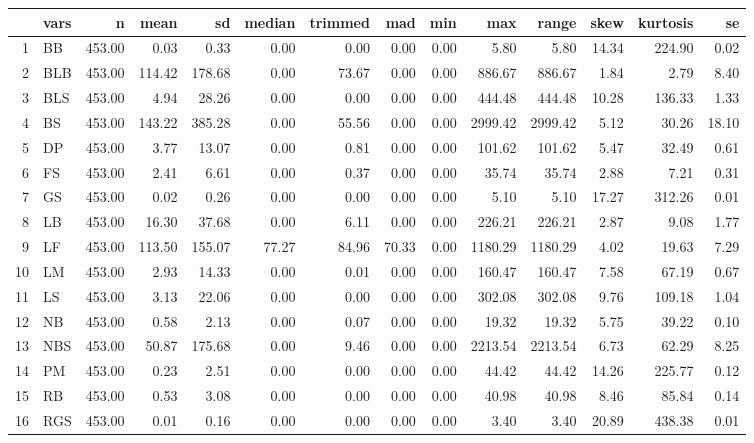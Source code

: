 \begin{table}[ht]
\centering
\begin{tabular}{rlrrrrrrrrrrrr}
  \hline
 & vars & n & mean & sd & median & trimmed & mad & min & max & range & skew & kurtosis & se \\ 
  \hline
1 & BB & 453.00 & 0.03 & 0.33 & 0.00 & 0.00 & 0.00 & 0.00 & 5.80 & 5.80 & 14.34 & 224.90 & 0.02 \\ 
  2 & BLB & 453.00 & 114.42 & 178.68 & 0.00 & 73.67 & 0.00 & 0.00 & 886.67 & 886.67 & 1.84 & 2.79 & 8.40 \\ 
  3 & BLS & 453.00 & 4.94 & 28.26 & 0.00 & 0.00 & 0.00 & 0.00 & 444.48 & 444.48 & 10.28 & 136.33 & 1.33 \\ 
  4 & BS & 453.00 & 143.22 & 385.28 & 0.00 & 55.56 & 0.00 & 0.00 & 2999.42 & 2999.42 & 5.12 & 30.26 & 18.10 \\ 
  5 & DP & 453.00 & 3.77 & 13.07 & 0.00 & 0.81 & 0.00 & 0.00 & 101.62 & 101.62 & 5.47 & 32.49 & 0.61 \\ 
  6 & FS & 453.00 & 2.41 & 6.61 & 0.00 & 0.37 & 0.00 & 0.00 & 35.74 & 35.74 & 2.88 & 7.21 & 0.31 \\ 
  7 & GS & 453.00 & 0.02 & 0.26 & 0.00 & 0.00 & 0.00 & 0.00 & 5.10 & 5.10 & 17.27 & 312.26 & 0.01 \\ 
  8 & LB & 453.00 & 16.30 & 37.68 & 0.00 & 6.11 & 0.00 & 0.00 & 226.21 & 226.21 & 2.87 & 9.08 & 1.77 \\ 
  9 & LF & 453.00 & 113.50 & 155.07 & 77.27 & 84.96 & 70.33 & 0.00 & 1180.29 & 1180.29 & 4.02 & 19.63 & 7.29 \\ 
  10 & LM & 453.00 & 2.93 & 14.33 & 0.00 & 0.01 & 0.00 & 0.00 & 160.47 & 160.47 & 7.58 & 67.19 & 0.67 \\ 
  11 & LS & 453.00 & 3.13 & 22.06 & 0.00 & 0.00 & 0.00 & 0.00 & 302.08 & 302.08 & 9.76 & 109.18 & 1.04 \\ 
  12 & NB & 453.00 & 0.58 & 2.13 & 0.00 & 0.07 & 0.00 & 0.00 & 19.32 & 19.32 & 5.75 & 39.22 & 0.10 \\ 
  13 & NBS & 453.00 & 50.87 & 175.68 & 0.00 & 9.46 & 0.00 & 0.00 & 2213.54 & 2213.54 & 6.73 & 62.29 & 8.25 \\ 
  14 & PM & 453.00 & 0.23 & 2.51 & 0.00 & 0.00 & 0.00 & 0.00 & 44.42 & 44.42 & 14.26 & 225.77 & 0.12 \\ 
  15 & RB & 453.00 & 0.53 & 3.08 & 0.00 & 0.00 & 0.00 & 0.00 & 40.98 & 40.98 & 8.46 & 85.84 & 0.14 \\ 
  16 & RGS & 453.00 & 0.01 & 0.16 & 0.00 & 0.00 & 0.00 & 0.00 & 3.40 & 3.40 & 20.89 & 438.38 & 0.01 \\ 

\end{tabular}
\end{table}

